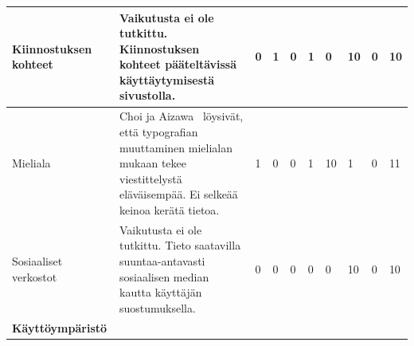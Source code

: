 \documentclass[finnish, 12pt, a4paper, elec, utf8, a-1b, online]{aaltothesis}
\begin{document}
{\begin{longtable}{p{2.5cm}|p{6cm}|p{0.5cm}p{0.5cm}p{0.5cm}|p{0.5cm}|p{0.5cm}p{0.5cm}p{0.5cm}|p{0.5cm}|}
        \midrule
        Kiinnostuksen kohteet                  & Vaikutusta ei ole tutkittu. Kiinnostuksen kohteet pääteltävissä käyttäytymisestä sivustolla.                                                                                                                                                                  & 0                                          & 1                                   & 0                                      & 1                            & 0                                               & 10                                        & 0                                         & 10                           \\
        \midrule
        Mieliala                               & Choi ja Aizawa~\cite{choi_aizawa_2018} löysivät, että typografian muuttaminen mielialan mukaan tekee viestittelystä eläväisempää. Ei selkeää keinoa kerätä tietoa.                                                                                            & 1                                          & 0                                   & 0                                      & 1                            & 10                                              & 1                                         & 0                                         & 11                           \\
        \midrule
        Sosiaaliset verkostot                  & Vaikutusta ei ole tutkittu. Tieto saatavilla suuntaa-antavasti sosiaalisen median kautta käyttäjän suostumuksella.                                                                                                                                            & 0                                          & 0                                   & 0                                      & 0                            & 0                                               & 10                                        & 0                                         & 10                           \\
        \midrule
        \textbf{Käyttöympäristö}                                                                                                                                                                                                                                                                                                                                                                                                                                                                                                                                                                                                                   \\

\end{longtable}}
\end{document}
